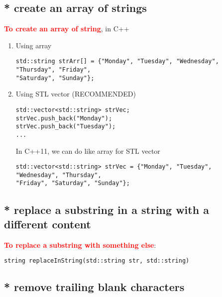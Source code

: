 \subsection{* create an array of strings}

\textcolor{red}{\bf To create an array of string}, in C++
\begin{enumerate}
  \item Using array
\begin{verbatim}
std::string strArr[] = {"Monday", "Tuesday", "Wednesday", "Thursday", "Friday",
"Saturday", "Sunday"};
\end{verbatim}
  \item Using STL vector (RECOMMENDED)
\begin{verbatim}
std::vector<std::string> strVec;
strVec.push_back("Monday");
strVec.push_back("Tuesday");
...
\end{verbatim}

In C++11, we can do like array for STL vector
\begin{verbatim}
std::vector<std::string> strVec = {"Monday", "Tuesday", "Wednesday", "Thursday",
"Friday", "Saturday", "Sunday"};
\end{verbatim}

\end{enumerate}


\subsection{* replace a substring in a string with a different content}

\textcolor{red}{\bf To replace a substring with something else}:
\begin{verbatim}
string replaceInString(std::string str, std::string)
\end{verbatim}

\subsection{* remove trailing blank characters}


